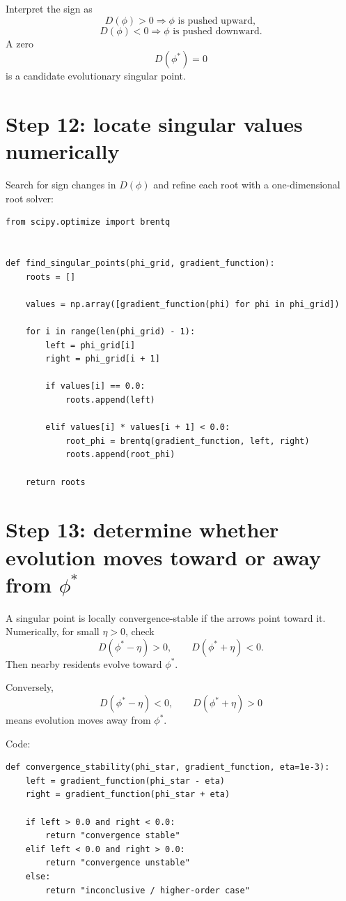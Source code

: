 \documentclass[11pt]{article}
\begin{document}
Interpret the sign as
\[
\boxed{
D(\phi)>0 \Rightarrow \phi \text{ is pushed upward},
}
\]
\[
\boxed{
D(\phi)<0 \Rightarrow \phi \text{ is pushed downward}.
}
\]
A zero
\[
D(\phi^*)=0
\]
is a candidate evolutionary singular point.

\section{Step 12: locate singular values numerically}

Search for sign changes in $D(\phi)$ and refine each root with a one-dimensional root solver:

\begin{lstlisting}
from scipy.optimize import brentq


def find_singular_points(phi_grid, gradient_function):
    roots = []

    values = np.array([gradient_function(phi) for phi in phi_grid])

    for i in range(len(phi_grid) - 1):
        left = phi_grid[i]
        right = phi_grid[i + 1]

        if values[i] == 0.0:
            roots.append(left)

        elif values[i] * values[i + 1] < 0.0:
            root_phi = brentq(gradient_function, left, right)
            roots.append(root_phi)

    return roots
\end{lstlisting}

\section{Step 13: determine whether evolution moves toward or away from $\phi^*$}

A singular point is locally convergence-stable if the arrows point toward it. Numerically, for small $\eta>0$, check
\[
D(\phi^*-\eta)>0,
\qquad
D(\phi^*+\eta)<0.
\]
Then nearby residents evolve toward $\phi^*$.

Conversely,
\[
D(\phi^*-\eta)<0,
\qquad
D(\phi^*+\eta)>0
\]
means evolution moves away from $\phi^*$.

Code:

\begin{lstlisting}
def convergence_stability(phi_star, gradient_function, eta=1e-3):
    left = gradient_function(phi_star - eta)
    right = gradient_function(phi_star + eta)

    if left > 0.0 and right < 0.0:
        return "convergence stable"
    elif left < 0.0 and right > 0.0:
        return "convergence unstable"
    else:
        return "inconclusive / higher-order case"
\end{lstlisting}
\end{document}
